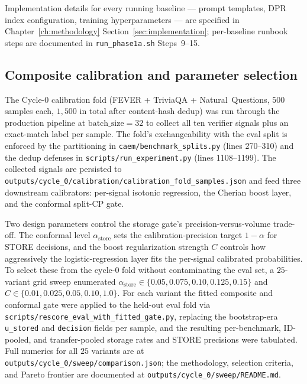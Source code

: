 Implementation details for every running baseline --- prompt templates, DPR index configuration, training hyperparameters --- are specified in Chapter~\ref{ch:methodology} Section~\ref{sec:implementation}; per-baseline runbook steps are documented in \texttt{run\_phase1a.sh} Steps~9--15.

\subsection{Composite calibration and parameter selection}
\label{sec:composite-calibration}

The Cycle-0 calibration fold (FEVER + TriviaQA + Natural~Questions, $500$ samples each, $1{,}500$ in total after content-hash dedup) was run through the production pipeline at $\mathrm{batch\_size}=32$ to collect all ten verifier signals plus an exact-match label per sample. The fold's exchangeability with the eval split is enforced by the partitioning in \texttt{caem/benchmark\_splits.py} (lines 270--310) and the dedup defenses in \texttt{scripts/run\_experiment.py} (lines 1108--1199). The collected signals are persisted to \texttt{outputs/cycle\_0/calibration/calibration\_fold\_samples.json} and feed three downstream calibrators: per-signal isotonic regression, the Cherian boost layer, and the conformal split-CP gate.

Two design parameters control the storage gate's precision-versus-volume trade-off. The conformal level $\alpha_{\text{store}}$ sets the calibration-precision target $1-\alpha$ for STORE decisions, and the boost regularization strength $C$ controls how aggressively the logistic-regression layer fits the per-signal calibrated probabilities. To select these from the cycle-0 fold without contaminating the eval set, a $25$-variant grid sweep enumerated $\alpha_{\text{store}} \in \{0.05, 0.075, 0.10, 0.125, 0.15\}$ and $C \in \{0.01, 0.025, 0.05, 0.10, 1.0\}$. For each variant the fitted composite and conformal gate were applied to the held-out eval fold via \texttt{scripts/rescore\_eval\_with\_fitted\_gate.py}, replacing the bootstrap-era \texttt{u\_stored} and \texttt{decision} fields per sample, and the resulting per-benchmark, ID-pooled, and transfer-pooled storage rates and STORE precisions were tabulated. Full numerics for all $25$ variants are at \texttt{outputs/cycle\_0/sweep/comparison.json}; the methodology, selection criteria, and Pareto frontier are documented at \texttt{outputs/cycle\_0/sweep/README.md}.

